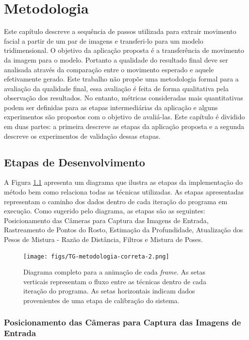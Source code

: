 \chapter{Metodologia}

Este capítulo descreve a sequência de passos utilizada para extrair movimento
facial a partir de um par de imagens e transferi-lo para um modelo
tridimensional. O objetivo da aplicação proposta é a transferência de movimento
da imagem para o modelo. Portanto a qualidade do resultado final deve ser
analisada através da comparação entre o movimento esperado e aquele efetivamente
gerado. Este trabalho não propõe uma metodologia formal para a avaliação da
qualidade final, essa avaliação é feita de forma qualitativa pela observação dos
resultados. No entanto, métricas consideradas mais quantitativas podem ser
definidas para as etapas intermediárias da aplicação e alguns experimentos são
propostos com o objetivo de avaliá-las. Este capítulo é dividido em duas partes:
a primeira descreve as etapas da aplicação proposta e a segunda descreve os
experimentos de validação dessas etapas.

\section{Etapas de Desenvolvimento}

A Figura \ref{fig:metodologia} apresenta um diagrama que ilustra as etapas da
implementação do método bem como relaciona todas as técnicas utilizadas. As
etapas apresentadas representam  o caminho dos dados dentro de cada iteração do
programa em execução.  Como sugerido pelo diagrama, as etapas são as seguintes:
Posicionamento das Câmeras para Captura das Imagens de Entrada, Rastreamento de
Pontos do Rosto, Estimação da Profundidade, Atualização dos Pesos de Mistura -
Razão de Distância, Filtros e Mistura de Poses. 

\begin{figure}
\centering
\texttt{[image: figs/TG-metodologia-correta-2.png]}

\caption{Diagrama completo para a animação de cada \textit{frame}. As setas
verticais representam o fluxo entre as técnicas dentro de cada iteração do
programa. As setas horizontais indicam dados provenientes de uma etapa de
calibração do sistema.}

\label{fig:metodologia}
\end{figure}



\subsection{Posicionamento das Câmeras para Captura das Imagens de Entrada}


